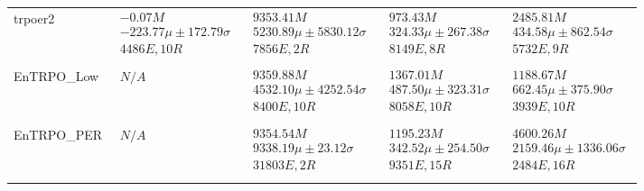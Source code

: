 \begin{tabular}{|l|p{3.2cm}|p{3.2cm}|p{3.2cm}|p{3.2cm}|}
trpoer2 & $\begin{array}{c} -0.07M \\ -223.77\mu \pm 172.79\sigma \\ 4486E, 10R \end{array}$ & $\begin{array}{c} 9353.41M \\ 5230.89\mu \pm 5830.12\sigma \\ 7856E, 2R \end{array}$ & $\begin{array}{c} 973.43M \\ 324.33\mu \pm 267.38\sigma \\ 8149E, 8R \end{array}$ & $\begin{array}{c} 2485.81M \\ 434.58\mu \pm 862.54\sigma \\ 5732E, 9R \end{array}$ \\ \\ \hline
EnTRPO_Low & $\begin{array}{c} N/A \end{array}$ & $\begin{array}{c} 9359.88M \\ 4532.10\mu \pm 4252.54\sigma \\ 8400E, 10R \end{array}$ & $\begin{array}{c} 1367.01M \\ 487.50\mu \pm 323.31\sigma \\ 8058E, 10R \end{array}$ & $\begin{array}{c} 1188.67M \\ 662.45\mu \pm 375.90\sigma \\ 3939E, 10R \end{array}$ \\ \\ \hline
EnTRPO_PER & $\begin{array}{c} N/A \end{array}$ & $\begin{array}{c} 9354.54M \\ 9338.19\mu \pm 23.12\sigma \\ 31803E, 2R \end{array}$ & $\begin{array}{c} 1195.23M \\ 342.52\mu \pm 254.50\sigma \\ 9351E, 15R \end{array}$ & $\begin{array}{c} 4600.26M \\ 2159.46\mu \pm 1336.06\sigma \\ 2484E, 16R \end{array}$ \\ \\ \hline

\end{tabular}
